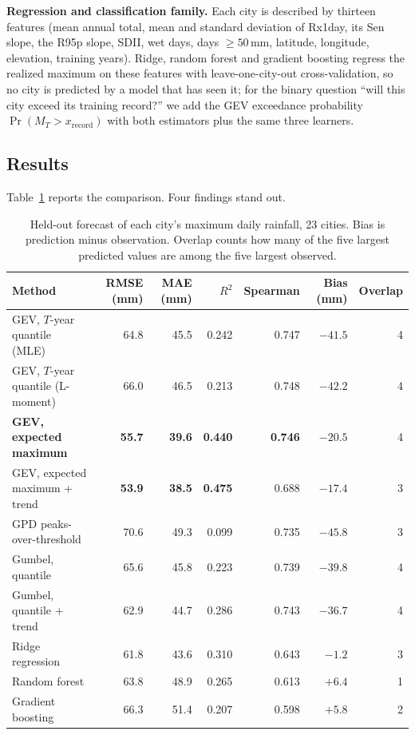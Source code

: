 \textbf{Regression and classification family.} Each city is described by thirteen features (mean annual total, mean and standard deviation of Rx1day, its Sen slope, the R95p slope, SDII, wet days, days $\ge50$\,mm, latitude, longitude, elevation, training years). Ridge, random forest and gradient boosting regress the realized maximum on these features with leave-one-city-out cross-validation, so no city is predicted by a model that has seen it; for the binary question ``will this city exceed its training record?'' we add the GEV exceedance probability $\Pr(M_T>x_{\text{record}})$ with both estimators plus the same three learners.

\subsection{Results}

Table~\ref{tab:q3} reports the comparison. Four findings stand out.

\begin{table}[H]
\centering
\caption{Held-out forecast of each city's maximum daily rainfall, 23 cities. Bias is prediction minus observation. Overlap counts how many of the five largest predicted values are among the five largest observed.}
\label{tab:q3}
\small
\begin{tabular}{lrrrrrr}
\toprule
Method & RMSE (mm) & MAE (mm) & $R^2$ & Spearman & Bias (mm) & Overlap\\
\midrule
GEV, $T$-year quantile (MLE) & 64.8 & 45.5 & 0.242 & 0.747 & $-41.5$ & 4\\
GEV, $T$-year quantile (L-moment) & 66.0 & 46.5 & 0.213 & 0.748 & $-42.2$ & 4\\
\textbf{GEV, expected maximum} & \textbf{55.7} & \textbf{39.6} & \textbf{0.440} & \textbf{0.746} & $-20.5$ & 4\\
GEV, expected maximum + trend & \textbf{53.9} & \textbf{38.5} & \textbf{0.475} & 0.688 & $-17.4$ & 3\\
GPD peaks-over-threshold & 70.6 & 49.3 & 0.099 & 0.735 & $-45.8$ & 3\\
Gumbel, quantile & 65.6 & 45.8 & 0.223 & 0.739 & $-39.8$ & 4\\
Gumbel, quantile + trend & 62.9 & 44.7 & 0.286 & 0.743 & $-36.7$ & 4\\
Ridge regression & 61.8 & 43.6 & 0.310 & 0.643 & $-1.2$ & 3\\
Random forest & 63.8 & 48.9 & 0.265 & 0.613 & $+6.4$ & 1\\
Gradient boosting & 66.3 & 51.4 & 0.207 & 0.598 & $+5.8$ & 2\\
\bottomrule
\end{tabular}
\end{table}

